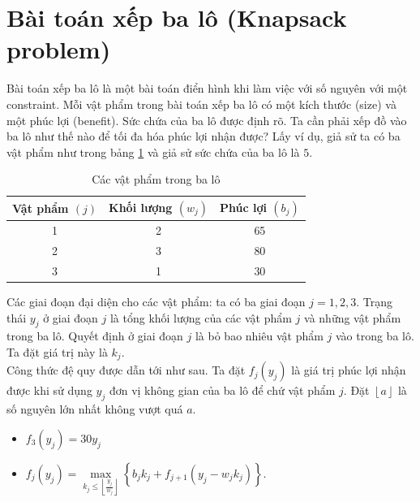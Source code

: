 \documentclass[12pt,a4paper]{article}
\begin{document}
\section{Bài toán xếp ba lô (Knapsack problem)}
Bài toán xếp ba lô là một bài toán điển hình khi làm việc với số nguyên với một constraint. Mỗi vật phẩm trong bài toán xếp ba lô có một kích thước (size) và một phúc lợi (benefit). Sức chứa của ba lô được định rõ. Ta cần phải xếp đồ vào ba lô như thế nào để tối đa hóa phúc lợi nhận được? Lấy ví dụ, giả sử ta có ba vật phẩm như trong bảng \ref{bang4} và giả sử sức chứa của ba lô là \(5.\)
\begin{center}
\begin{table}[H]
\label{bang4}
\begin{tabular}{|c|c|c|}
\hline 
Vật phẩm \(\left( {j} \right)\) & Khối lượng \(\left( {w_j} \right)\) & Phúc lợi \(\left( {b_j} \right)\) \\ 
\hline 
1 & 2 & 65 \\ 
\hline 
2 & 3 & 80 \\ 
\hline 
3 & 1 & 30 \\ 
\hline 
\end{tabular} 
\caption{Các vật phẩm trong ba lô}
\end{table}
\end{center}
Các giai đoạn đại diện cho các vật phẩm: ta có ba giai đoạn \(j = 1, 2, 3.\) Trạng thái \(y_j\) ở giai đoạn \(j\) là tổng khối lượng của các vật phẩm \(j\) và những vật phẩm trong ba lô. Quyết định ở giai đoạn \(j\) là bỏ bao nhiêu vật phẩm \(j\) vào trong ba lô. Ta đặt giá trị này là \(k_j.\)\\
Công thức đệ quy được dẫn tới như sau. Ta đặt \({f_j}\left( {{y_j}} \right)\) là giá trị phúc lợi nhận được khi sử dụng \(y_j\) đơn vị không gian của ba lô để chứ vật phẩm \(j.\) Đặt \(\left\lfloor a \right\rfloor \) là số nguyên lớn nhất không vượt quá \(a.\)
\begin{itemize}
\item \({f_3}\left( {{y_j}} \right) = 30{y_j}\)
\item \({f_j}\left( {{y_j}} \right) = \mathop {\max }\limits_{{k_j} \leqslant \left\lfloor {\frac{{{y_j}}}{{{w_j}}}} \right\rfloor } \left\{ {{b_j}{k_j} + {f_{j + 1}}\left( {{y_j} - {w_j}{k_j}} \right)} \right\}.\)
\end{itemize}
\end{document}
